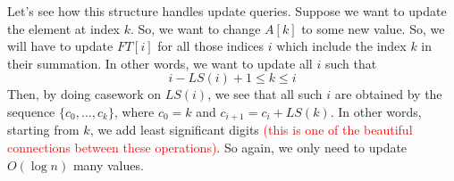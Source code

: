 \documentclass[12pt,a4paper]{amsart}
\numberwithin{equation}{section}
\theoremstyle{definition}
\begin{document}
Let's see how this structure handles update queries. Suppose we want to update the element at index $k$. So, we want to change $A[k]$ to some new value. So, we will have to update $FT[i]$ for all those indices $i$ which include the index $k$ in their summation. In other words, we want to update all $i$ such that 
$$i - LS(i) + 1 \le k \le i$$
Then, by doing casework on $LS(i)$, we see that all such $i$ are obtained by the sequence $\{c_0,...,c_k\}$, where $c_0 = k$ and $c_{i + 1} = c_i + LS(k)$. In other words, starting from $k$, we add least significant digits \textcolor{red}{(this is one of the beautiful connections between these operations)}. So again, we only need to update $O(\log n)$ many values. 
\end{document}
